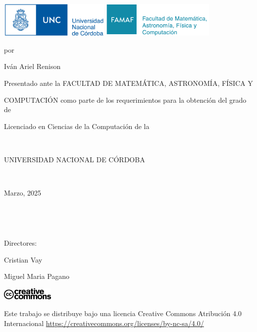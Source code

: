 \begin{center}

  \vspace{0.5cm}

  \begin{minipage}[t]{\textwidth}
      \raggedright
      \includegraphics[height=1.7cm]{logos/unc.jpg} %
      \hfill
      \includegraphics[height=1.7cm]{logos/famaf.png} %
  \end{minipage}

  \vspace{3cm} %

  \begin{huge}
    \textbf{\tituloTesis}
  \end{huge}

  \vspace{0.3cm}

  por

  {\Large Iván Ariel Renison}

  \vspace{2cm}

  Presentado ante la FACULTAD DE MATEMÁTICA, ASTRONOMÍA, FÍSICA Y

  COMPUTACIÓN como parte de los requerimientos para la obtención del grado de

  Licenciado en Ciencias de la Computación de la

  \

  UNIVERSIDAD NACIONAL DE CÓRDOBA

  \

  Marzo, 2025

  \

  \

  \begin{large}
    Directores:

    Cristian Vay

    Miguel Maria Pagano
  \end{large}


  \vfill

  \includegraphics[height=0.6cm]{logos/cc.png}

  Este trabajo se distribuye bajo una licencia Creative Commons
  Atribución 4.0 Internacional \href{https://creativecommons.org/licenses/by-nc-sa/4.0/}{https://creativecommons.org/licenses/by-nc-sa/4.0/}

  \vspace{0.5cm}
\end{center}
\newpage
